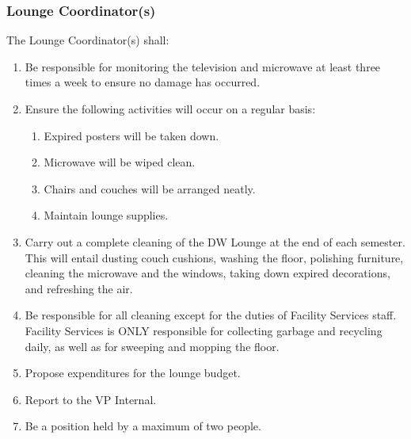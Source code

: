 \subsubsection{Lounge Coordinator(s)}
\label{dw-lounge-coordinators}
The Lounge Coordinator(s) shall:

\begin{enumerate}
 \item
  Be responsible for monitoring the television and microwave at least three times a week to ensure no damage has occurred.
 \item
  Ensure the following activities will occur on a regular basis:

  \begin{enumerate}
   \item
    Expired posters will be taken down.
   \item
    Microwave will be wiped clean.
   \item
    Chairs and couches will be arranged neatly.
   \item
    Maintain lounge supplies.
  \end{enumerate}
 \item
  Carry out a complete cleaning of the DW Lounge at the end of each semester. This will entail dusting couch cushions, washing the floor, polishing furniture, cleaning the microwave and the windows, taking down expired decorations, and refreshing the air.
 \item
  Be responsible for all cleaning except for the duties of Facility Services staff. Facility Services is ONLY responsible for collecting garbage and recycling daily, as well as for sweeping and mopping the floor.
 \item
  Propose expenditures for the lounge budget.
 \item
  Report to the VP Internal.
 \item
  Be a position held by a maximum of two people.
\end{enumerate}
